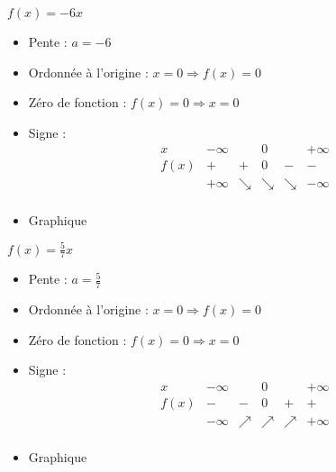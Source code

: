 \begin{solution}
$f(x)=-6x$
\begin{itemize}
\item Pente :	$a=-6$
\item Ordonnée à l’origine :	$x=0\Rightarrow f(x)=0$
\item Zéro de fonction :	$f(x)=0\Rightarrow x=0$
\item Signe :	$$\begin{array}{l|l|l|l|l|l}
x    & -\infty &   & 0 &   & +\infty \\
\hline
f(x) & +       & + & 0  & - & -   \\
 & +\infty & \searrow & \searrow & \searrow & -\infty \\   
\end{array}$$
\item Graphique
\end{itemize}
\end{solution}

\begin{solution}
$f(x)=\frac{5}{7}x$
\begin{itemize}
\item Pente :	$a=\frac{5}{7}$
\item Ordonnée à l’origine :	$x=0\Rightarrow f(x)=0$ 
\item Zéro de fonction :	$f(x)=0\Rightarrow x=0$
\item Signe :	$$\begin{array}{l|l|l|l|l|l}
x    & -\infty &   & 0 &   & +\infty \\
\hline
f(x) & -       & - & 0  & + & +   \\
 & -\infty & \nearrow & \nearrow & \nearrow & +\infty \\   
\end{array}$$
\item Graphique
\end{itemize}
\end{solution}

